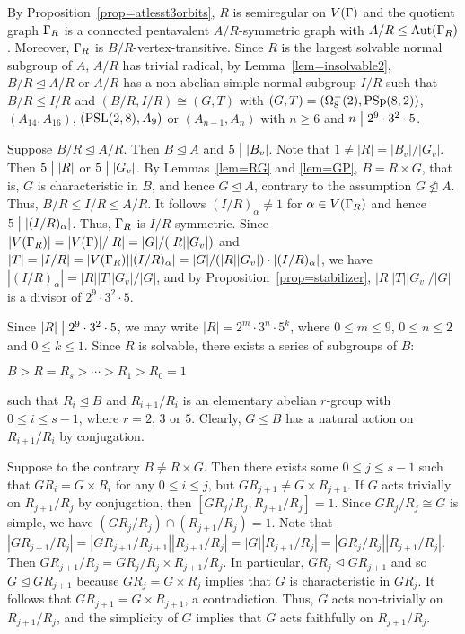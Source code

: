 \documentclass[12pt]{article}
\def\a{\alpha} \def\b{\beta} \def\g{\gamma} \def\d{\delta} \def\e{\varepsilon}
\def\di{\bigm|} \def\lg{\langle} \def\rg{\rangle}
\def\PSL{\hbox{\rm PSL}}\def\PSU{\hbox{\rm PSU}}
\def\PSp{\hbox{\rm PSp}}\def\P\GammaL{\hbox{\rm P\Gamma L}} \def\ASIL{\hbox{\rm A\Sigma L}}
\def\Aut{\hbox{\rm Aut}}
\begin{document}
By Proposition~\ref{prop=atlesst3orbits}, $R$ is semiregular on $V(\Gamma)$ and the quotient graph $\Gamma_{R}$ is a
connected pentavalent $A/R$-symmetric graph with $A/R\leq \Aut(\G_{R})$. Moreover, $\Gamma_R$ is $B/R$-vertex-transitive.
Since $R$ is the largest solvable normal subgroup of $A$, $A/R$ has trivial radical, by Lemma~\ref{lem=insolvable2},
$B/R\unlhd A/R$ or $A/R$ has a non-abelian simple normal subgroup $I/R$ such that $B/R\leq I/R$ and
$(B/R,I/R) \cong (G,T)$ with $(G,T)=(\Omega^-_8(2),\PSp(8,2))$, $(A_{14},A_{16})$, $(\PSL(2,8),A_{9})$ or $(A_{n-1},A_n)$ with $n\geq 6$ and $n\di 2^9\cdot3^2\cdot5$.

Suppose $B/R \unlhd A/R$. Then $B\unlhd A$ and $5\di |B_v|$. Note that $1\not=|R|=|B_v|/|G_v|$. Then $5 \di |R|$
or $5\di |G_v|$. By Lemmas~\ref{lem=RG} and \ref{lem=GP}, $B=R\times G$, that is, $G$ is characteristic in $B$, and hence $G\unlhd A$,
contrary to the assumption $G\ntrianglelefteq A$. Thus, $B/R\leq I/R\unlhd A/R$. It follows $(I/R)_\a\not=1$ for $\a\in V(\G_R)$ and hence $5\di |(I/R)_\a|$. Thus, $\Gamma_R$ is $I/R$-symmetric. Since $|V(\Gamma_R)|=|V(\Gamma)|/|R|=|G|/(|R||G_v|)$ and $|T|=|I/R|=|V(\G_R)||(I/R)_\a|=|G|/(|R||G_v|)\cdot |(I/R)_\a|$, we have $|(I/R)_\a|=|R||T||G_v|/|G|$, and by  Proposition~\ref{prop=stabilizer}, $|R||T||G_v|/|G|$ is a divisor of $2^9\cdot 3^2\cdot 5$.

Since $|R|\di 2^9\cdot 3^2\cdot 5$, we may write $|R|=2^m\cdot3^n\cdot 5^k$, where $0\leq m\leq 9$,
$0\leq n\leq 2$ and $0\leq k\leq 1$. Since $R$ is solvable, there exists a series of subgroups of $B$:
\begin{center}
$B>R=R_{s}>\cdots >R_1>R_0=1$
\end{center}
such that $R_i\unlhd B$ and $R_{i+1}/R_i$ is an elementary abelian $r$-group with $0\leq i\leq s-1$, where
$r=2$, $3$ or $5$. Clearly, $G\leq B$ has a natural action on $R_{i+1}/R_i$ by conjugation.

Suppose to the contrary $B\neq R\times G$. Then there exists some $0\leq j\leq s-1$ such that $GR_i=G\times R_i$ for any $0\leq i\leq j$,
but $GR_{j+1}\not=G\times R_{j+1}$. If $G$ acts trivially on $R_{j+1}/R_j$ by conjugation, then $[GR_j/R_j,R_{j+1}/R_j]=1$.
Since $GR_j/R_j\cong G$ is simple, we have $(GR_j/R_j)\cap (R_{j+1}/R_j)=1$. Note that $|GR_{j+1}/R_j|=|GR_{j+1}/R_{j+1}||R_{j+1}/R_j|=|G||R_{j+1}/R_j|=|GR_j/R_j||R_{j+1}/R_j|$. Then $GR_{j+1}/R_j=GR_j/R_j\times R_{j+1}/R_j$. In particular, $GR_j\unlhd GR_{j+1}$ and so $G\unlhd GR_{j+1}$ because $GR_j=G\times R_j$
implies that $G$ is characteristic in $GR_j$. It follows that $GR_{j+1}=G\times R_{j+1}$, a contradiction.
Thus, $G$ acts non-trivially on $R_{j+1}/R_j$, and the simplicity of $G$ implies that $G$ acts faithfully
on $R_{j+1}/R_j$.
\end{document}
